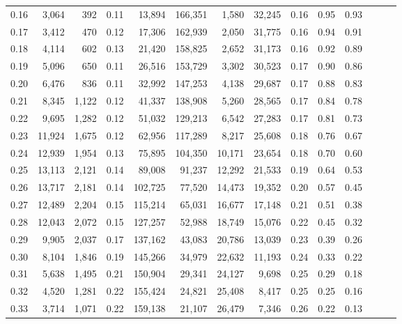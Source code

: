 \begin{tabular}{rrrrrrrrrrrrrr}
0.16 &   3,064 &    392 &  0.11 &   13,894 &  166,351 &   1,580 &  32,245 &  0.16 &  0.95 &      0.93 \\
0.17 &   3,412 &    470 &  0.12 &   17,306 &  162,939 &   2,050 &  31,775 &  0.16 &  0.94 &      0.91 \\
0.18 &   4,114 &    602 &  0.13 &   21,420 &  158,825 &   2,652 &  31,173 &  0.16 &  0.92 &      0.89 \\
0.19 &   5,096 &    650 &  0.11 &   26,516 &  153,729 &   3,302 &  30,523 &  0.17 &  0.90 &      0.86 \\
0.20 &   6,476 &    836 &  0.11 &   32,992 &  147,253 &   4,138 &  29,687 &  0.17 &  0.88 &      0.83 \\
0.21 &   8,345 &  1,122 &  0.12 &   41,337 &  138,908 &   5,260 &  28,565 &  0.17 &  0.84 &      0.78 \\
0.22 &   9,695 &  1,282 &  0.12 &   51,032 &  129,213 &   6,542 &  27,283 &  0.17 &  0.81 &      0.73 \\
0.23 &  11,924 &  1,675 &  0.12 &   62,956 &  117,289 &   8,217 &  25,608 &  0.18 &  0.76 &      0.67 \\
0.24 &  12,939 &  1,954 &  0.13 &   75,895 &  104,350 &  10,171 &  23,654 &  0.18 &  0.70 &      0.60 \\
0.25 &  13,113 &  2,121 &  0.14 &   89,008 &   91,237 &  12,292 &  21,533 &  0.19 &  0.64 &      0.53 \\
0.26 &  13,717 &  2,181 &  0.14 &  102,725 &   77,520 &  14,473 &  19,352 &  0.20 &  0.57 &      0.45 \\
0.27 &  12,489 &  2,204 &  0.15 &  115,214 &   65,031 &  16,677 &  17,148 &  0.21 &  0.51 &      0.38 \\
0.28 &  12,043 &  2,072 &  0.15 &  127,257 &   52,988 &  18,749 &  15,076 &  0.22 &  0.45 &      0.32 \\
0.29 &   9,905 &  2,037 &  0.17 &  137,162 &   43,083 &  20,786 &  13,039 &  0.23 &  0.39 &      0.26 \\
0.30 &   8,104 &  1,846 &  0.19 &  145,266 &   34,979 &  22,632 &  11,193 &  0.24 &  0.33 &      0.22 \\
0.31 &   5,638 &  1,495 &  0.21 &  150,904 &   29,341 &  24,127 &   9,698 &  0.25 &  0.29 &      0.18 \\
0.32 &   4,520 &  1,281 &  0.22 &  155,424 &   24,821 &  25,408 &   8,417 &  0.25 &  0.25 &      0.16 \\
0.33 &   3,714 &  1,071 &  0.22 &  159,138 &   21,107 &  26,479 &   7,346 &  0.26 &  0.22 &      0.13 \\

\end{tabular}

